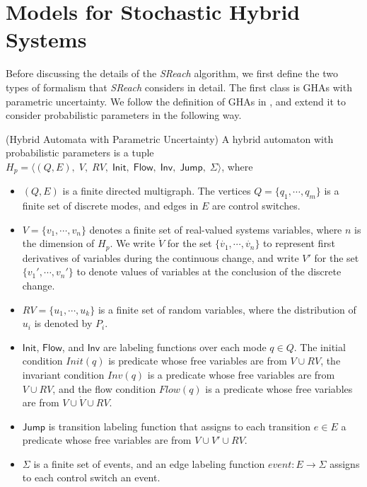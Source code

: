 \section{Models for Stochastic Hybrid Systems}
Before discussing the details of the {\it SReach} algorithm, we first define the two types of formalism that {\it SReach} considers in detail. The first class is GHAs with parametric uncertainty. We follow the definition of GHAs in \cite{henzinger2000theory}, and extend it to consider probabilistic parameters in the following way.
\vspace{-.8cm}
\begin{definition}
\label{def:ha_para}
{\rm(Hybrid Automata with Parametric Uncertainty)} A hybrid automaton with probabilistic parameters is a tuple $H_p = \langle (Q, E), \;V, \;RV, \; \mathsf{Init},\; \mathsf{Flow}, \; \mathsf{Inv}, \; \mathsf{Jump}, \; \Sigma \rangle$, where
\vspace{-.4cm}
\begin{itemize}
\item $(Q, E)$ is a finite directed multigraph. The vertices $Q=\{q_1, \cdots,q_m\}$ is a finite set of discrete modes, and edges in $E$ are control switches.
\vspace{-.2cm}
\item $V = \{ v_1, \cdots, v_n \}$ denotes a finite set of real-valued systems variables, where $n$ is the dimension of $H_p$. We write $\dot{V}$ for the set $\{\dot{v_1}, \cdots, \dot{v_n}\}$ to represent first derivatives of variables during the continuous change, and write $V'$ for the set $\{v_1', \cdots, v_n'\}$ to denote values of variables at the conclusion of the discrete change.
\vspace{-.2cm}
\item $RV = \{ u_1, \cdots, u_k \}$ is a finite set of random variables, where the distribution of $u_i$ is denoted by $P_i$.
\vspace{-.2cm}
\item $\mathsf{Init}$, $\mathsf{Flow}$, and $\mathsf{Inv}$ are labeling functions over each mode $q \in Q$. The initial condition $Init(q)$ is predicate whose free variables are from $V \cup RV$, the invariant condition $Inv(q)$ is a predicate whose free variables are from $V \cup RV$, and the flow condition $Flow(q)$ is a predicate whose free variables are from $V \cup \dot{V} \cup RV$.
\vspace{-.2cm}
\item $\mathsf{Jump}$ is transition labeling function that assigns to each transition $e \in E$ a predicate whose free variables are from $V \cup V' \cup RV$.
\vspace{-.2cm}
\item $\Sigma$ is a finite set of events, and an edge labeling function $event: E \to \Sigma$ assigns to each control switch an event. 
\end{itemize}
\end{definition}
